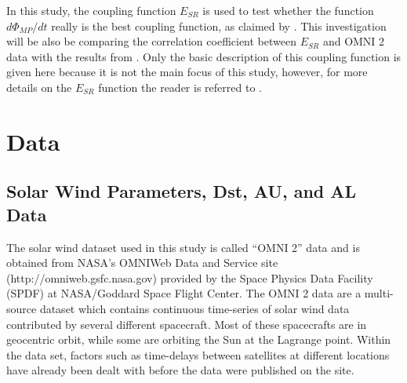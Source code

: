\documentclass[12pt]{report} %
\begin{document}
In this study, the coupling function $E_{SR}$ is used to test whether the function $d\Phi_{MP}/dt$ really is the best coupling function, as claimed by \cite{newell07}. This investigation will be also be comparing the correlation coefficient between $E_{SR}$ and OMNI 2 data with the results from \cite{newell07}. Only the basic description of this coupling function is given here because it is not the main focus of this study, however, for more details on the $E_{SR}$ function the reader is referred to \cite{scurry91}.

 
 
 

\chapter{Data}
\vspace{0pt}
\section{Solar Wind Parameters, Dst, AU, and AL Data} \label{sec:solardata}
\vspace{0pt}
The solar wind dataset used in this study is called ``OMNI 2'' data and is obtained from NASA's OMNIWeb Data and Service site (http://omniweb.gsfc.nasa.gov) provided by the Space Physics Data Facility (SPDF) at NASA/Goddard Space Flight Center. The OMNI 2 data are a multi-source dataset which contains continuous time-series of solar wind data contributed by several different spacecraft. Most of these spacecrafts are in geocentric orbit, while some are orbiting the Sun at the Lagrange point. Within the data set, factors such as time-delays between satellites at different locations have already been dealt with before the data were published on the site.  
\end{document}

